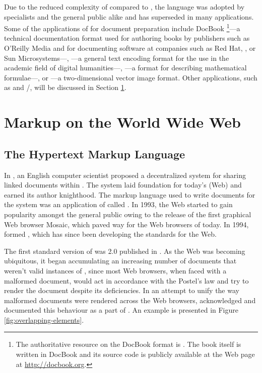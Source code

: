\documentclass{book}
\begin{document}
Due to the reduced complexity of  compared to , the
language was adopted by specialists and the general public alike and has
superseded  in many applications. Some of the applications of
 for document preparation include DocBook%
\footnote{
  The authoritative resource on the DocBook  format is
  \cite{walsh10}. The book itself is written in DocBook and its source code is
  publicly available at the Web page at \url{http://docbook.org}.
}---a technical documentation format used for authoring books by publishers such
as O'Reilly Media and for documenting software at companies such as Red Hat,
, or Sun Microsystems---, ---a general text encoding
format for the use in the academic field of digital humanities---,
---a format for describing mathematical formulae---, or
---a two-dimensional vector image format. Other 
applications, such as  and /, will
be discussed in Section \ref{sec:www-markup}.
      
\section{Markup on the World Wide Web}\label{sec:www-markup}
\subsection{The Hypertext Markup Language}
In \cite{bernerslee89}, an English computer scientist  proposed a decentralized system for sharing linked documents within
. The system laid foundation for today's  (Web) and earned its author knighthood.  The markup language used to write
documents for the system was an application of  called
. In 1993, the Web started to gain popularity amongst the general
public owing to the release of the first graphical Web browser Mosaic, which
paved way for the Web browsers of today. In 1994,  formed , which has since been developing the standards
for the Web.

The first standard version of  was  2.0 published in
\cite{rfc1866}. As the Web was becoming ubiquitous, it began accumulating an
increasing number of documents that weren't valid instances of ,
since most Web browsers, when faced with a malformed document, would act in
accordance with the Postel's law and try to render the document despite its
deficiencies. In an attempt to unify the way malformed  documents
were rendered across the Web browsers,  acknowledged and documented
this behaviour as a part of \cite[Section~8.2, Parsing HTML
documents]{hickson14}. An example is presented in Figure
\ref{fig:overlapping-elements}.
\end{document}
